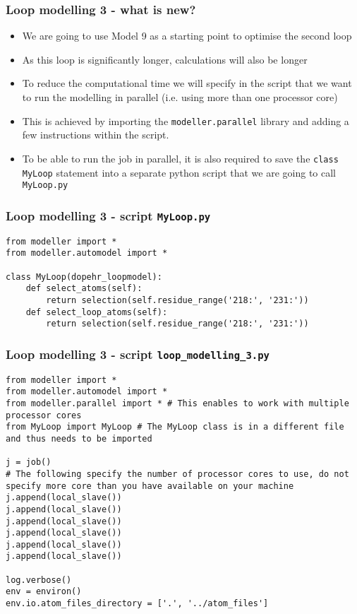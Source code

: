 \begin{frame}[fragile]
\frametitle{Loop modelling 3 - what is new?}
\begin{itemize}
\item We are going to use Model 9 as a starting point to optimise the second loop 
\newline
\item As this loop is significantly longer, calculations will also be longer
\newline
\item To reduce the computational time we will specify in the script that we want to run the modelling in parallel (i.e. using more than one processor core)
\newline
\item This is achieved by importing the \texttt{modeller.parallel} library and adding a few instructions within the script.
\newline
\item To be able to run the job in parallel, it is also required to save the \texttt{class MyLoop} statement into a separate python script that we are going to call \texttt{MyLoop.py}
\end{itemize}

\end{frame}

\begin{frame}[fragile]
\frametitle{Loop modelling 3 - script \texttt{MyLoop.py}}
\begin{lstlisting}
from modeller import *
from modeller.automodel import * 

class MyLoop(dopehr_loopmodel):
    def select_atoms(self):
        return selection(self.residue_range('218:', '231:'))
    def select_loop_atoms(self):
        return selection(self.residue_range('218:', '231:'))
\end{lstlisting}
\end{frame}

\begin{frame}[fragile]
\frametitle{Loop modelling 3 - script \texttt{loop\_modelling\_3.py}}
\begin{lstlisting}
from modeller import *
from modeller.automodel import * 
from modeller.parallel import * # This enables to work with multiple processor cores
from MyLoop import MyLoop # The MyLoop class is in a different file and thus needs to be imported 

j = job()
# The following specify the number of processor cores to use, do not specify more core than you have available on your machine
j.append(local_slave())
j.append(local_slave())
j.append(local_slave())
j.append(local_slave())
j.append(local_slave())
j.append(local_slave())

log.verbose()
env = environ()
env.io.atom_files_directory = ['.', '../atom_files']
\end{lstlisting}
\end{frame}

